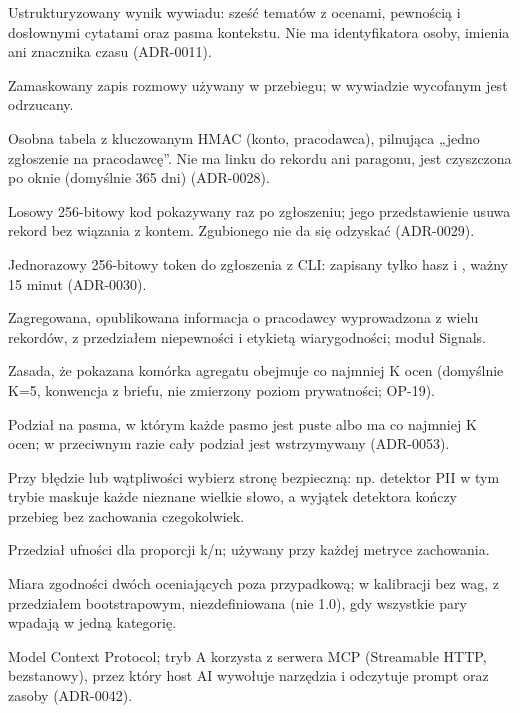 \begin{description}[leftmargin=!,labelwidth=3.4cm,itemsep=3pt,style=nextline]
  \item[Rekord] Ustrukturyzowany wynik wywiadu: sześć tematów z ocenami, pewnością i dosłownymi cytatami oraz pasma kontekstu. Nie ma identyfikatora osoby, imienia ani znacznika czasu (ADR-0011).
  \item[Transkrypt] Zamaskowany zapis rozmowy używany w przebiegu; w wywiadzie wycofanym jest odrzucany.
  \item[Ledger (rejestr zgłoszeń)] Osobna tabela z kluczowanym HMAC (konto, pracodawca), pilnująca „jedno zgłoszenie na pracodawcę”. Nie ma linku do rekordu ani paragonu, jest czyszczona po oknie (domyślnie 365 dni) (ADR-0028).
  \item[Paragon (receipt)] Losowy 256-bitowy kod pokazywany raz po zgłoszeniu; jego przedstawienie usuwa rekord bez wiązania z kontem. Zgubionego nie da się odzyskać (ADR-0029).
  \item[Bilet (ticket)] Jednorazowy 256-bitowy token do zgłoszenia z CLI: zapisany tylko hasz i , ważny 15 minut (ADR-0030).
  \item[Sygnał] Zagregowana, opublikowana informacja o pracodawcy wyprowadzona z wielu rekordów, z przedziałem niepewności i etykietą wiarygodności; moduł Signals.
  \item[K-anonimowość] Zasada, że pokazana komórka agregatu obejmuje co najmniej K ocen (domyślnie K=5, konwencja z briefu, nie zmierzony poziom prywatności; OP-19).
  \item[Czysta partycja] Podział na pasma, w którym każde pasmo jest puste albo ma co najmniej K ocen; w przeciwnym razie cały podział jest wstrzymywany (ADR-0053).
  \item[Fail-closed] Przy błędzie lub wątpliwości wybierz stronę bezpieczną: np. detektor PII w tym trybie maskuje każde nieznane wielkie słowo, a wyjątek detektora kończy przebieg bez zachowania czegokolwiek.
  \item[Przedział Wilsona] Przedział ufności dla proporcji k/n; używany przy każdej metryce zachowania.
  \item[Kappa Cohena] Miara zgodności dwóch oceniających poza przypadkową; w kalibracji bez wag, z przedziałem bootstrapowym, niezdefiniowana (nie 1.0), gdy wszystkie pary wpadają w jedną kategorię.
  \item[MCP] Model Context Protocol; tryb A korzysta z serwera MCP (Streamable HTTP, bezstanowy), przez który host AI wywołuje narzędzia i odczytuje prompt oraz zasoby (ADR-0042).

\end{description}
